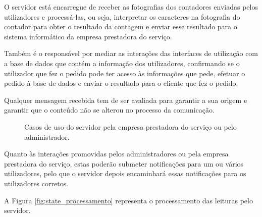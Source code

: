 O servidor está encarregue de receber as fotografias dos contadores enviadas pelos utilizadores e processá-las, ou seja, interpretar os caracteres na fotografia do contador para obter o resultado da contagem e enviar esse resultado para o sistema informático da empresa prestadora do serviço.\par
Também é o responsável por mediar as interações das interfaces de utilização com a base de dados que contém a informação dos utilizadores, confirmando se o utilizador que fez o pedido pode ter acesso às informações que pede, efetuar o pedido à base de dados e enviar o resultado para o cliente que fez o pedido.\par
Qualquer mensagem recebida tem de ser avaliada para garantir a sua origem e garantir que o conteúdo não se alterou no processo da comunicação.\par


\begin{figure}[h!]
\begin{center}
\caption{Casos de uso do servidor pela empresa prestadora do serviço ou pelo administrador.}
\label{fig:uso_serv2}
\end{center}
\end{figure}

Quanto às interações promovidas pelos administradores ou pela empresa prestadora do serviço, estas poderão submeter notificações para um ou vários utilizadores, pelo que o servidor depois encaminhará essas notificações para os utilizadores corretos.

A Figura \ref{fig:state_processamento} representa o processamento das leituras pelo servidor.

